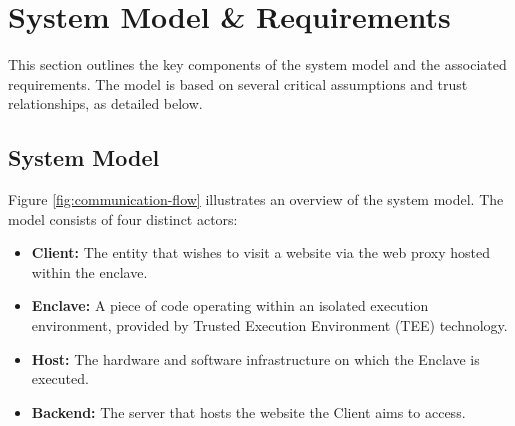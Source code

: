 \chapter{System Model \& Requirements}\label{ch:sample-chapter}
This section outlines the key components of the system model and the associated requirements. The model is based on several critical assumptions and trust relationships, as detailed below.

\section{System Model}
Figure \ref{fig:communication-flow} illustrates an overview of the system model. The model consists of four distinct actors:
\begin{itemize}
    \item \textbf{Client:} The entity that wishes to visit a website via the web proxy hosted within the enclave.
    \item \textbf{Enclave:} A piece of code operating within an isolated execution environment, provided by Trusted Execution Environment (TEE) technology.    
    \item \textbf{Host:} The hardware and software infrastructure on which the Enclave is executed.
    \item \textbf{Backend:} The server that hosts the website the Client aims to access.
\end{itemize}

